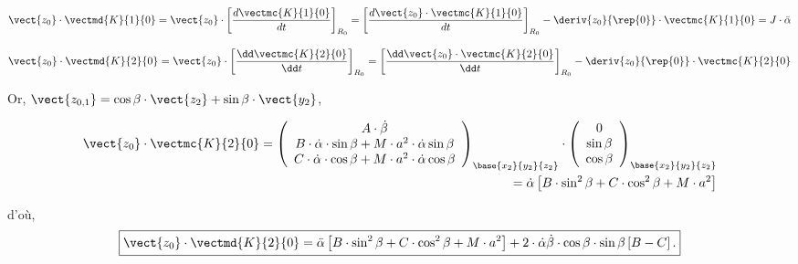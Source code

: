 
\ifprof
\begin{corrige}
\begin{align*}
\vect{z_0}\cdot \vectmd{K}{1}{0}=\vect{z_0}\cdot\left[\frac{d\vectmc{K}{1}{0}}{dt}\right]_{R_0}
=\left[\frac{d\vect{z_0}\cdot\vectmc{K}{1}{0}}{dt}\right]_{R_0}- \deriv{z_0}{\rep{0}}\cdot \vectmc{K}{1}{0}=J\cdot \ddot{\alpha}
\end{align*}
\end{corrige}
\else
\fi



\ifprof
\begin{corrige}
\begin{align*}
\vect{z_0}\cdot \vectmd{K}{2}{0}=\vect{z_0}\cdot\left[\frac{\dd\vectmc{K}{2}{0}}{\dd t}\right]_{R_0}
=\left[\frac{\dd \vect{z_0}\cdot\vectmc{K}{2}{0}}{\dd t}\right]_{R_0}- \deriv{z_0}{\rep{0}}\cdot \vectmc{K}{2}{0}
\end{align*}

Or, $\vect{z_{0,1}}=\cos\beta\cdot \vect{z_2}+\sin\beta\cdot \vect{y_{2}}$,

\begin{align*}
\vect{z_0}\cdot\vectmc{K}{2}{0}=
\left(
\begin{array}{c}
A\cdot \dot{\beta}\\
B\cdot \dot{\alpha}\cdot \sin\beta+M\cdot a^2\cdot \dot{\alpha}\sin\beta\\
C\cdot \dot{\alpha}\cdot \cos\beta+M\cdot a^2\cdot \dot{\alpha}\cos\beta\\
\end{array}
\right)_{\base{{x}_2}{{y}_2}{{z}_2}}
\cdot
\left(
\begin{array}{c}
0\\
\sin\beta\\
\cos\beta\\
\end{array}
\right)_{\base{{x}_2}{{y}_2}{{z}_2}}
\\
=\dot{\alpha}\left[B\cdot \sin^2\beta+C\cdot \cos^2\beta+M\cdot a^2\right]
\end{align*}

d'où,
\begin{align*}
\boxed{
\vect{z_0}\cdot \vectmd{K}{2}{0}=\ddot{\alpha}\left[B\cdot \sin^2\beta+C\cdot \cos^2\beta+M\cdot a^2\right]
+2\cdot\dot{\alpha}\dot{\beta}\cdot \cos\beta\cdot \sin\beta\left[B-C\right].
}
\end{align*}
\end{corrige}
\else
\fi


